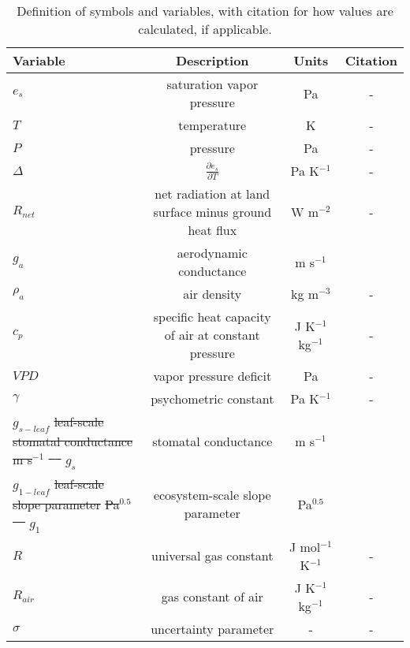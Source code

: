 \documentclass[hess, manuscript]{copernicus}
\providecommand{\DIFdeltex}[1]{{\protect\color{red}\sout{#1}}}                      %
\providecommand{\DIFdelFL}[1]{\DIFdel{#1}} %
\providecommand{\DIFdelbeginFL}{} %
\providecommand{\DIFdelendFL}{} %
\providecommand{\DIFdel}[1]{\texorpdfstring{\DIFdeltex{#1}}{}} %
\begin{document}
\begin{table}
  \caption{Definition of symbols and variables, with citation for how
    values are calculated, if applicable.}
  \label{definitions}
  \centering \footnotesize
  \begin{tabular}{l c c c}
    \hline
    Variable & Description & Units & Citation \\
    \hline
    $e_s$  & saturation vapor pressure & Pa  & - \\
    $T$  & temperature  & K & - \\
    $P$  & pressure & Pa  & - \\
    $\Delta$  & $\frac{\partial e_s}{\partial T}$ & Pa K$^{-1}$ & - \\
    $R_{net}$  & net radiation at land surface minus ground heat flux & W m$^{-2}$   & - \\
    $g_a$  & aerodynamic conductance & m s$^{-1}$  & \citet{Shuttleworth_2012} \\
    $\rho_a$  & air density & kg m$^{-3}$  & - \\
    $c_p$  & specific heat capacity of air at constant pressure & J K$^{-1}$ kg$^{-1}$ & - \\
    $VPD$  & vapor pressure deficit & Pa  & - \\
    $\gamma$  & psychometric constant & Pa K$^{-1}$   & - \\
    \DIFdelbeginFL \DIFdelFL{$g_{s-leaf}$  }%
\DIFdelFL{leaf-scale stomatal conductance }%
\DIFdelFL{m s$^{-1}$  }%
\DIFdelFL{\mbox{%
\citet{MEDLYN_2011} }%
}%
\DIFdelendFL $g_{s}$  &  stomatal conductance & m s$^{-1}$
                                   & \citet{Medlyn_2017} \\
    \DIFdelbeginFL \DIFdelFL{$g_{1-leaf}$  }%
\DIFdelFL{leaf-scale slope parameter }%
\DIFdelFL{Pa$^{0.5}$
                                   }%
\DIFdelFL{\mbox{%
\citet{MEDLYN_2011} }%
}%
\DIFdelendFL $g_{1}$  & ecosystem-scale slope parameter & Pa$^{0.5}$ & \citet{Medlyn_2017} \\
    $R$ & universal gas constant & J mol$^{-1}$ K$^{-1}$ & - \\
    $R_{air}$ & gas constant of air & J  K$^{-1}$ kg$^{-1}$ & - \\
    $\sigma$ & uncertainty parameter & -& - \\

\end{tabular}
\end{table}
\end{document}
